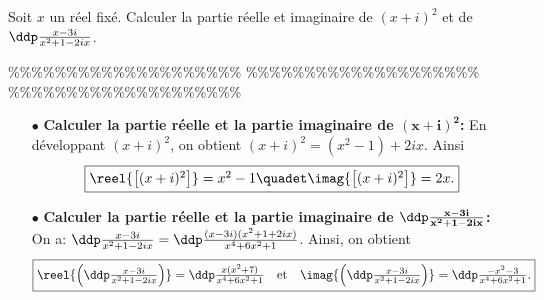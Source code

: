 



\begin{exercice}  \;
Soit $x$ un r\'eel fix\'e. Calculer la partie r\'eelle et imaginaire de 
$(x+i)^2$ et de $\ddp\frac{x-3i}{x^2+1-2ix}$.
\end{exercice}


\%\%\%\%\%\%\%\%\%\%\%\%\%\%\%\%\%\%\%\%
\%\%\%\%\%\%\%\%\%\%\%\%\%\%\%\%\%\%\%\%
\%\%\%\%\%\%\%\%\%\%\%\%\%\%\%\%\%\%\%\%




\begin{correction}   \;
\begin{itemize}
\item[$\bullet$] \textbf{Calculer la partie r\'eelle et la partie imaginaire de $\mathbf{(x+i)^2}$:}
En d\'eveloppant $(x+i)^2$, on obtient $(x+i)^2=(x^2-1)+2i x$. Ainsi
$$\fbox{$\reel{\left\lbrack(x+i)^2\right\rbrack}=x^2-1\quadet \imag{\left\lbrack(x+i)^2\right\rbrack}=2x.$}$$
\item[$\bullet$]  \textbf{Calculer la partie r\'eelle et la partie imaginaire de $\mathbf{\ddp\frac{x-3i}{x^2+1-2i x}}$:}
On a: $\ddp\frac{x-3i}{x^2+1-2i x}=\ddp\frac{(x-3i)(x^2+1+2i x)}{x^4+6x^2+1}$.
Ainsi, on obtient
$$\fbox{$\reel{ \left(\ddp\frac{x-3i}{x^2+1-2i x}\right)}=\ddp\frac{x(x^2+7)}{x^4+6x^2+1}\quad\hbox{et}\quad \imag{\left(\ddp\frac{x-3i}{x^2+1-2i x}\right)}=\ddp\frac{-x^2-3}{x^4+6x^2+1}.$}$$
\end{itemize}
\end{correction}